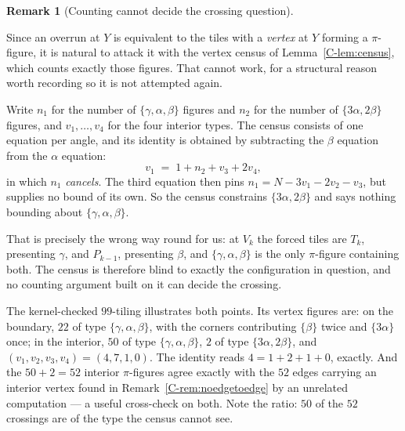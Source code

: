 \documentclass[11pt,reqno]{amsart}
\theoremstyle{plain}
\theoremstyle{definition}
\newtheorem{remark}[theorem]{Remark}
\begin{document}
\begin{remark}[Counting cannot decide the crossing question]\label{O-censusblind}

Since an overrun at $Y$ is equivalent to the tiles with a \emph{vertex} at $Y$ forming a
$\pi$-figure, it is natural to attack it with the vertex census of
Lemma~\ref{C-lem:census}, which counts exactly those figures. That cannot work, for a structural
reason worth recording so it is not attempted again.

Write $n_1$ for the number of $\{\gamma,\alpha,\beta\}$ figures and $n_2$ for the number of
$\{3\alpha,2\beta\}$ figures, and $v_1,\dots,v_4$ for the four interior types. The census consists of
one equation per angle, and its identity is obtained by subtracting the $\beta$ equation from the
$\alpha$ equation:
\[
v_1 \;=\; 1+n_2+v_3+2v_4 ,
\]
in which $n_1$ \emph{cancels}. The third equation then pins $n_1=N-3v_1-2v_2-v_3$, but supplies no
bound of its own. So the census constrains $\{3\alpha,2\beta\}$ and says nothing bounding about
$\{\gamma,\alpha,\beta\}$.

That is precisely the wrong way round for us: at $V_k$ the forced tiles are $T_k$, presenting
$\gamma$, and $P_{k-1}$, presenting $\beta$, and $\{\gamma,\alpha,\beta\}$ is the only $\pi$-figure
containing both. The census is therefore blind to exactly the configuration in question, and no
counting argument built on it can decide the crossing.

The kernel-checked $99$-tiling illustrates both points. Its vertex figures are: on the boundary,
$22$ of type $\{\gamma,\alpha,\beta\}$, with the corners contributing $\{\beta\}$ twice and
$\{3\alpha\}$ once; in the interior, $50$ of type $\{\gamma,\alpha,\beta\}$, $2$ of type
$\{3\alpha,2\beta\}$, and $(v_1,v_2,v_3,v_4)=(4,7,1,0)$. The identity reads $4=1+2+1+0$, exactly. And
the $50+2=52$ interior $\pi$-figures agree exactly with the $52$ edges carrying an interior vertex
found in Remark~\ref{C-rem:noedgetoedge} by an unrelated computation --- a useful cross-check on both.
Note the ratio: $50$ of the $52$ crossings are of the type the census cannot see.
\end{remark}
\end{document}
